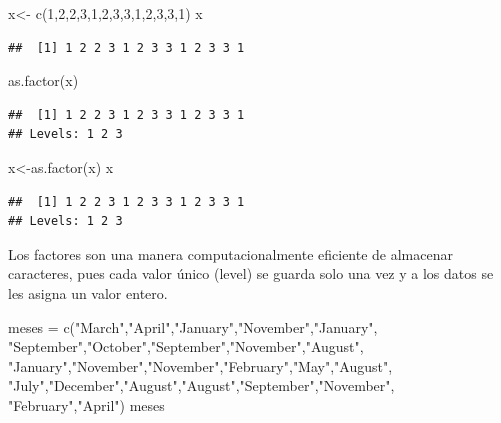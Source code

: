 \documentclass[
]{book}
\newenvironment{Shaded}{\begin{snugshade}}{\end{snugshade}}
\newcommand{\DecValTok}[1]{\textcolor[rgb]{0.00,0.00,0.81}{#1}}
\newcommand{\FunctionTok}[1]{\textcolor[rgb]{0.00,0.00,0.00}{#1}}
\newcommand{\NormalTok}[1]{#1}
\newcommand{\OtherTok}[1]{\textcolor[rgb]{0.56,0.35,0.01}{#1}}
\newcommand{\StringTok}[1]{\textcolor[rgb]{0.31,0.60,0.02}{#1}}
\begin{document}
\begin{Shaded}
\begin{Highlighting}[]
\NormalTok{x}\OtherTok{\textless{}{-}} \FunctionTok{c}\NormalTok{(}\DecValTok{1}\NormalTok{,}\DecValTok{2}\NormalTok{,}\DecValTok{2}\NormalTok{,}\DecValTok{3}\NormalTok{,}\DecValTok{1}\NormalTok{,}\DecValTok{2}\NormalTok{,}\DecValTok{3}\NormalTok{,}\DecValTok{3}\NormalTok{,}\DecValTok{1}\NormalTok{,}\DecValTok{2}\NormalTok{,}\DecValTok{3}\NormalTok{,}\DecValTok{3}\NormalTok{,}\DecValTok{1}\NormalTok{)}
\NormalTok{x}
\end{Highlighting}
\end{Shaded}

\begin{verbatim}
##  [1] 1 2 2 3 1 2 3 3 1 2 3 3 1
\end{verbatim}

\begin{Shaded}
\begin{Highlighting}[]
\FunctionTok{as.factor}\NormalTok{(x)}
\end{Highlighting}
\end{Shaded}

\begin{verbatim}
##  [1] 1 2 2 3 1 2 3 3 1 2 3 3 1
## Levels: 1 2 3
\end{verbatim}

\begin{Shaded}
\begin{Highlighting}[]
\NormalTok{x}\OtherTok{\textless{}{-}}\FunctionTok{as.factor}\NormalTok{(x)}
\NormalTok{x}
\end{Highlighting}
\end{Shaded}

\begin{verbatim}
##  [1] 1 2 2 3 1 2 3 3 1 2 3 3 1
## Levels: 1 2 3
\end{verbatim}

Los factores son una manera computacionalmente eficiente de almacenar caracteres, pues cada valor único (level) se guarda solo una vez y a los datos se les asigna un valor entero.

\begin{Shaded}
\begin{Highlighting}[]
\NormalTok{meses }\OtherTok{=} \FunctionTok{c}\NormalTok{(}\StringTok{"March"}\NormalTok{,}\StringTok{"April"}\NormalTok{,}\StringTok{"January"}\NormalTok{,}\StringTok{"November"}\NormalTok{,}\StringTok{"January"}\NormalTok{,}
       \StringTok{"September"}\NormalTok{,}\StringTok{"October"}\NormalTok{,}\StringTok{"September"}\NormalTok{,}\StringTok{"November"}\NormalTok{,}\StringTok{"August"}\NormalTok{,}
        \StringTok{"January"}\NormalTok{,}\StringTok{"November"}\NormalTok{,}\StringTok{"November"}\NormalTok{,}\StringTok{"February"}\NormalTok{,}\StringTok{"May"}\NormalTok{,}\StringTok{"August"}\NormalTok{,}
        \StringTok{"July"}\NormalTok{,}\StringTok{"December"}\NormalTok{,}\StringTok{"August"}\NormalTok{,}\StringTok{"August"}\NormalTok{,}\StringTok{"September"}\NormalTok{,}\StringTok{"November"}\NormalTok{,}
         \StringTok{"February"}\NormalTok{,}\StringTok{"April"}\NormalTok{)}
\NormalTok{meses}
\end{Highlighting}
\end{Shaded}
\end{document}

